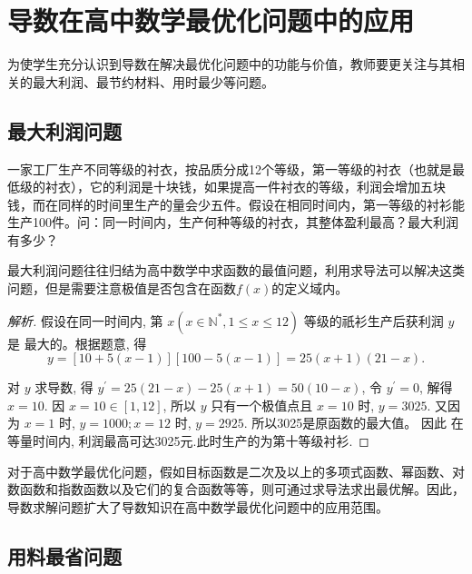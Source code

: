 \chapter{导数在高中数学最优化问题中的应用}

为使学生充分认识到导数在解决最优化问题中的功能与价值，教师要更关注与其相关的最大利润、最节约材料、用时最少等问题。


\section{最大利润问题}

\begin{example}
  一家工厂生产不同等级的衬衣，按品质分成12个等级，第一等级的衬衣（也就是最低级的衬衣），它的利润是十块钱，如果提高一件衬衣的等级，利润会增加五块钱，而在同样的时间里生产的量会少五件。假设在相同时间内，第一等级的衬衫能生产100件。问：同一时间内，生产何种等级的衬衣，其整体盈利最高？最大利润有多少？\cite{张双林2013导数在实际生活中的最优化应用}
\end{example}

\begin{analysis}
  最大利润问题往往归结为高中数学中求函数的最值问题，利用求导法可以解决这类问题，但是需要注意极值是否包含在函数$f(x)$的定义域内。
\end{analysis}

\begin{proof}[解析]
  假设在同一时间内, 第 ${x}\left(x \in \mathbb{N}^{*}, 1 \leq x \leq 12\right)$ 等级的祇衫生产后获利润 ${y}$ 是 最大的。根据题意, 得
  \[
  y=[10+5(x-1)][100-5(x-1)]=25(x+1)(21-x).\] 

  对 $y$ 求导数, 得 $y^{\prime}=25(21-x)-25(x+1)=50(10-x)$,
  令 $y^{\prime}=0$, 解得 $x=10$. 因 $x=10 \in[1,12]$, 所以 $y$ 只有一个极值点且 $x=10$ 时, $y=3025$.
  又因为 $x=1$ 时, $y=1000 ; x=12$ 时, $y=2925$. 所以3025是原函数的最大值。 因此 在等量时间内, 利润最高可达3025元.此时生产的为第十等级衬衫.
\end{proof}

\begin{review}
  对于高中数学最优化问题，假如目标函数是二次及以上的多项式函数、幂函数、对数函数和指数函数以及它们的复合函数等等，则可通过求导法求出最优解。因此，导数求解问题扩大了导数知识在高中数学最优化问题中的应用范围。
\end{review}



\section{用料最省问题}

